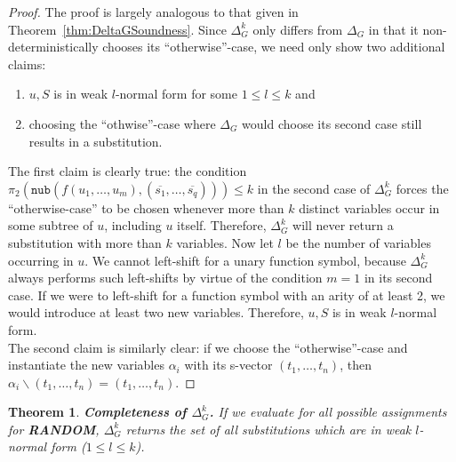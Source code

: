 \documentclass[a4paper, 11pt]{report}
\newtheorem{theorem}{Theorem}
\begin{document}
\begin{proof}
The proof is largely analogous to that given in Theorem~\ref{thm:DeltaGSoundness}. Since $\Delta_G^k$ only differs from $\Delta_G$ in that it non-deterministically chooses its ``otherwise''-case, we need only show two additional claims:

\begin{enumerate}
  \item $u,S$ is in weak $l$-normal form for some $1 \leq l \leq k$ and
  \item choosing the ``othwise''-case where $\Delta_G$ would choose its second case still results in a substitution.
\end{enumerate}

The first claim is clearly true: the condition\\
$\pi_2(\texttt{nub}(f(u_1,\dots,u_m), (\overline{s_1},\dots,\overline{s_q}))) \leq k$ in the second case of $\Delta_G^k$ forces the ``otherwise-case'' to be chosen whenever more than $k$ distinct variables occur in some subtree of $u$, including $u$ itself. Therefore, $\Delta_G^k$ will never return a substitution with more than $k$ variables. Now let $l$ be the number of variables occurring in $u$. We cannot left-shift for a unary function symbol, because $\Delta_G^k$ always performs such left-shifts by virtue of the condition $m = 1$ in its second case. If we were to left-shift for a function symbol with an arity of at least 2, we would introduce at least two new variables. Therefore, $u,S$ is in weak $l$-normal form.\\

The second claim is similarly clear: if we choose the ``otherwise''-case and instantiate the new variables $\alpha_i$ with its s-vector $(t_1,\dots,t_n)$, then
$\alpha_i\backslash(t_1,\dots,t_n)=(t_1,\dots,t_n)$.
\end{proof}


\begin{theorem}
\textbf{Completeness of $\Delta_G^k$.}
If we evaluate for all possible assignments for \textbf{RANDOM}, $\Delta_G^k$ returns the set of all substitutions which are in weak $l$-normal form ($1 \leq l \leq k$).
\label{thm:DeltaGkCompletenss}
\end{theorem}
\end{document}
